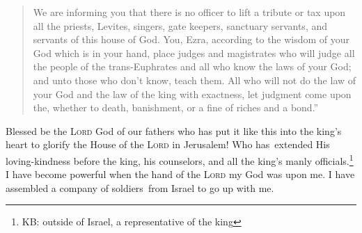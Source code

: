 \begin{quote}
\begin{inparaenum}
         We are informing you that there is no officer to lift a tribute or tax upon all the priests, Levites, singers, gate keepers, sanctuary servants, and servants of this house of God.%
         You, Ezra, according to the wisdom of your God which is in your hand, place judges and magistrates who will judge all the people of the trans-Euphrates and all who know the laws of your God; and unto those who don't know, teach them.%
         All who will not do the law of your God and the law of the king with exactness, let judgment come upon the, whether to death, banishment, or a fine of riches and a bond.''%
    \end{inparaenum}
\end{quote}
\begin{inparaenum}\setcounter{enumi}{26}
     Blessed be the \textsc{Lord} God of our fathers who has put it like this into the king's heart to glorify the House of the \textsc{Lord} in Jerusalem!%
     Who has\understood\ extended His loving-kindness before the king, his counselors, and all the king's manly officials.\footnote{KB: outside of Israel, a representative of the king} I have become powerful when the hand of the \textsc{Lord} my God was upon me. I have assembled a company of soldiers\understood\ from Israel to go up with me.%
\end{inparaenum}
